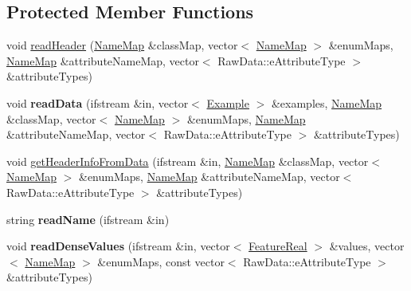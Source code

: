 \subsection*{Protected Member Functions}
\begin{DoxyCompactItemize}
\item 
void \hyperlink{classMultiBoost_1_1SVMLightParser_acfc5877abd0a1567d744b1eff8d88514}{read\-Header} (\hyperlink{classMultiBoost_1_1NameMap}{Name\-Map} \&class\-Map, vector$<$ \hyperlink{classMultiBoost_1_1NameMap}{Name\-Map} $>$ \&enum\-Maps, \hyperlink{classMultiBoost_1_1NameMap}{Name\-Map} \&attribute\-Name\-Map, vector$<$ Raw\-Data\-::e\-Attribute\-Type $>$ \&attribute\-Types)
\item 
\hypertarget{classMultiBoost_1_1SVMLightParser_a9ae8cd5c95e20edb4f08dee04fc33577}{void {\bfseries read\-Data} (ifstream \&in, vector$<$ \hyperlink{classMultiBoost_1_1Example}{Example} $>$ \&examples, \hyperlink{classMultiBoost_1_1NameMap}{Name\-Map} \&class\-Map, vector$<$ \hyperlink{classMultiBoost_1_1NameMap}{Name\-Map} $>$ \&enum\-Maps, \hyperlink{classMultiBoost_1_1NameMap}{Name\-Map} \&attribute\-Name\-Map, vector$<$ Raw\-Data\-::e\-Attribute\-Type $>$ \&attribute\-Types)}\label{classMultiBoost_1_1SVMLightParser_a9ae8cd5c95e20edb4f08dee04fc33577}

\item 
void \hyperlink{classMultiBoost_1_1SVMLightParser_a9734c917c4bb91468ab0c109768713ba}{get\-Header\-Info\-From\-Data} (ifstream \&in, \hyperlink{classMultiBoost_1_1NameMap}{Name\-Map} \&class\-Map, vector$<$ \hyperlink{classMultiBoost_1_1NameMap}{Name\-Map} $>$ \&enum\-Maps, \hyperlink{classMultiBoost_1_1NameMap}{Name\-Map} \&attribute\-Name\-Map, vector$<$ Raw\-Data\-::e\-Attribute\-Type $>$ \&attribute\-Types)
\item 
\hypertarget{classMultiBoost_1_1SVMLightParser_a8ad14196bfa8eb3db2c79ea7afcd6f8b}{string {\bfseries read\-Name} (ifstream \&in)}\label{classMultiBoost_1_1SVMLightParser_a8ad14196bfa8eb3db2c79ea7afcd6f8b}

\item 
\hypertarget{classMultiBoost_1_1SVMLightParser_a3c7f8138778c5f21d58d45be3e7a70be}{void {\bfseries read\-Dense\-Values} (ifstream \&in, vector$<$ \hyperlink{Defaults_8h_a3a11cfe6a5d469d921716ca6291e934f}{Feature\-Real} $>$ \&values, vector$<$ \hyperlink{classMultiBoost_1_1NameMap}{Name\-Map} $>$ \&enum\-Maps, const vector$<$ Raw\-Data\-::e\-Attribute\-Type $>$ \&attribute\-Types)}\label{classMultiBoost_1_1SVMLightParser_a3c7f8138778c5f21d58d45be3e7a70be}


\end{DoxyCompactItemize}
